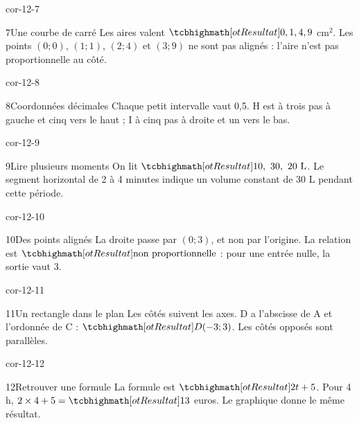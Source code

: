 \begin{blocLivre}{cor-12-7}\begin{corrige}{7}{Une courbe de carré}
Les aires valent $\res{0,1,4,9}$ cm$^2$. Les points $(0;0)$, $(1;1)$, $(2;4)$ et $(3;9)$ ne sont pas alignés : l’aire n’est pas proportionnelle au côté.
\label{fig-cor-12-7}
\end{corrige}\end{blocLivre}
\begin{blocLivre}{cor-12-8}\begin{corrige}{8}{Coordonnées décimales}
Chaque petit intervalle vaut 0,5. H est à trois pas à gauche et cinq vers le haut ; I à cinq pas à droite et un vers le bas.
\label{fig-cor-12-8}
\end{corrige}\end{blocLivre}
\begin{blocLivre}{cor-12-9}\begin{corrige}{9}{Lire plusieurs moments}
On lit $\res{10,\ 30,\ 20\ \mathrm L}$. Le segment horizontal de 2 à 4 minutes indique un volume constant de 30 L pendant cette période.
\label{fig-cor-12-9}
\end{corrige}\end{blocLivre}
\begin{blocLivre}{cor-12-10}\begin{corrige}{10}{Des points alignés}
La droite passe par $(0;3)$, et non par l’origine. La relation est $\res{\text{non proportionnelle}}$ : pour une entrée nulle, la sortie vaut 3.
\label{fig-cor-12-10}
\end{corrige}\end{blocLivre}
\begin{blocLivre}{cor-12-11}\begin{corrige}{11}{Un rectangle dans le plan}
Les côtés suivent les axes. D a l’abscisse de A et l’ordonnée de C : $\res{D(-3;3)}$. Les côtés opposés sont parallèles.
\label{fig-cor-12-11}
\end{corrige}\end{blocLivre}
\begin{blocLivre}{cor-12-12}\begin{corrige}{12}{Retrouver une formule}
La formule est $\res{2t+5}$. Pour 4 h, $2\times4+5=\res{13}$ euros. Le graphique donne le même résultat.
\label{fig-cor-12-12}
\end{corrige}\end{blocLivre}
